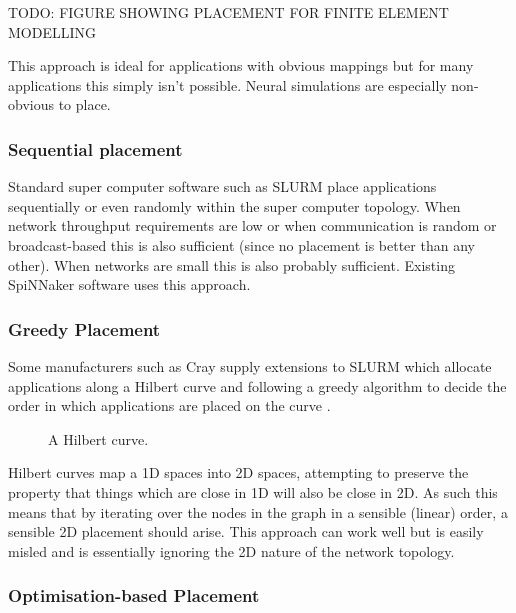 				TODO: FIGURE SHOWING PLACEMENT FOR FINITE ELEMENT MODELLING
				
				This approach is ideal for applications with obvious mappings but for
				many applications this simply isn't possible. Neural simulations are
				especially non-obvious to place.
			
			\subsubsection{Sequential placement}
				
				Standard super computer software such as SLURM place applications
				sequentially or even randomly within the super computer topology. When
				network throughput requirements are low or when communication is random
				or broadcast-based this is also sufficient (since no placement is
				better than any other). When networks are small this is also probably
				sufficient. Existing SpiNNaker software uses this approach.
			
			\subsubsection{Greedy Placement}
				
				Some manufacturers such as Cray supply extensions to SLURM which
				allocate applications along a Hilbert curve and following a greedy
				algorithm to decide the order in which applications are placed on the
				curve \cite{yoo03}.
				
				\begin{figure}
					\center
					
					\caption{A Hilbert curve.}
					\label{fig:hilbert-placement}
				\end{figure}
				
				Hilbert curves map a 1D spaces into 2D spaces, attempting to preserve
				the property that things which are close in 1D will also be close in
				2D. As such this means that by iterating over the nodes in the graph in
				a sensible (linear) order, a sensible 2D placement should arise. This
				approach can work well but is easily misled and is essentially ignoring
				the 2D nature of the network topology.
			
			\subsubsection{Optimisation-based Placement}
				
